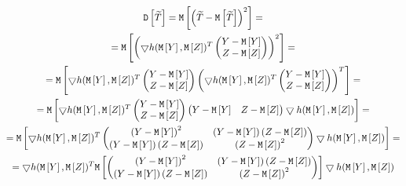 \begin{multline}
    \mathtt{D} \left [ \widetilde{T} \right ]
    = \mathtt{M} \left [ \left ( \widetilde{T} - \mathtt{M} \left [ \widetilde{T} \right ] \right )^2 \right ] = \\
    = \mathtt{M} \left [ \left ( \bigtriangledown h(\mathtt{M} \left [ Y \right ], \mathtt{M} \left [ Z \right ])^T \begin{pmatrix}
                                                                                      Y - \mathtt{M} \left [ Y \right ] \\ Z - \mathtt{M} \left [ Z \right ]
    \end{pmatrix} \right )^2 \right ] = \\
    = \mathtt{M} \left [ \bigtriangledown h(\mathtt{M} \left [ Y \right ], \mathtt{M} \left [ Z \right ])^T \begin{pmatrix}
                                                                              Y - \mathtt{M} \left [ Y \right ] \\ Z - \mathtt{M} \left [ Z \right ]
    \end{pmatrix} \left ( \bigtriangledown h(\mathtt{M} \left [ Y \right ], \mathtt{M} \left [ Z \right ])^T \begin{pmatrix}
                                                                                     Y - \mathtt{M} \left [ Y \right ] \\ Z - \mathtt{M} \left [ Z \right ]
    \end{pmatrix} \right )^T \right ] = \\
    = \mathtt{M} \left [  \bigtriangledown h(\mathtt{M} \left [ Y \right ], \mathtt{M} \left [ Z \right ])^T \begin{pmatrix}
                                                                               Y - \mathtt{M} \left [ Y \right ] \\ Z - \mathtt{M} \left [ Z \right ]
    \end{pmatrix} \begin{pmatrix}
                      Y - \mathtt{M} \left [ Y \right ] & Z - \mathtt{M} \left [ Z \right ]
    \end{pmatrix} \bigtriangledown h(\mathtt{M} \left [ Y \right ], \mathtt{M} \left [ Z \right ]) \right ] = \\
    = \mathtt{M} \left [ 
        \bigtriangledown h(\mathtt{M} \left [ Y \right ], \mathtt{M} \left [ Z \right ])^T
        \begin{pmatrix}
            \left ( Y - \mathtt{M} \left [ Y \right ] \right )^2                                    & \left ( Y - \mathtt{M} \left [ Y \right ] \right ) \left ( Z - \mathtt{M} \left [ Z \right ] \right ) \\
            \left ( Y - \mathtt{M} \left [ Y \right ] \right ) \left ( Z - \mathtt{M} \left [ Z \right ] \right ) & \left ( Z - \mathtt{M} \left [ Z \right ] \right )^2
        \end{pmatrix}
        \bigtriangledown h(\mathtt{M} \left [ Y \right ], \mathtt{M} \left [ Z \right ])
     \right ] = \\
    = \bigtriangledown h(\mathtt{M} \left [ Y \right ], \mathtt{M} \left [ Z \right ])^T
    \mathtt{M} \left [ 
        \begin{pmatrix}
            \left ( Y - \mathtt{M} \left [ Y \right ] \right )^2                                    & \left ( Y - \mathtt{M} \left [ Y \right ] \right ) \left ( Z - \mathtt{M} \left [ Z \right ] \right ) \\
            \left ( Y - \mathtt{M} \left [ Y \right ] \right ) \left ( Z - \mathtt{M} \left [ Z \right ] \right ) & \left ( Z - \mathtt{M} \left [ Z \right ] \right )^2
        \end{pmatrix}
     \right ]
    \bigtriangledown h(\mathtt{M} \left [ Y \right ], \mathtt{M} \left [ Z \right ])
\end{multline}
